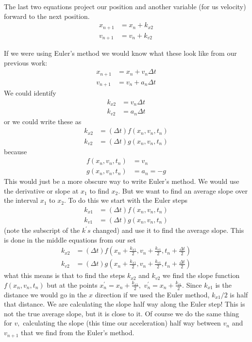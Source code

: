 \documentclass[twoside,11pt,ShortChapTitles]{BYUTextbook}
\begin{document}
The last two equations project our position and another variable (for us
velocity) forward to the next position. 
\begin{align*}
x_{n+1}  & =x_{n}+k_{x2}\\
v_{n+1}  & =v_{n}+k_{v2} \end{align*}


If we were using Euler's method we would know what these look like from our
previous work: 
\begin{align*}
x_{n+1}  & =x_{n}+v_{n}\Delta t\\
v_{n+1}  & =v_{n}+a_{n}\Delta t
\end{align*}
We could identify \begin{align*}
k_{x2}  & =v_{n}\Delta t\\
k_{v2}  & =a_{n}\Delta t
\end{align*}
or we could write these as
\begin{align*}
k_{x2}  & =(\Delta t)f(x_{n},v_{n},t_{n})\\
k_{v2}  & =(\Delta t)g(x_{n},v_{n},t_{n})
\end{align*}
because
\begin{align*}
f(x_{n},v_{n},t_{n})  & =v_{n}\\
g(x_{n},v_{n},t_{n})  & =a_{n}=-g
\end{align*}
This would just be a more obscure way to write Euler's method. We would use
the derivative or slope at $x_{1}$ to find $x_{2}.$ But we want to find an
average slope over the interval $x_{1}$ to $x_{2}.$ To do this we start with
the Euler steps
\begin{align*}
k_{x1}  & =(\Delta t)f(x_{n},v_{n},t_{n})\\
k_{v1}  & =(\Delta t)g(x_{n},v_{n},t_{n})
\end{align*}
(note the subscript of the $k^{\prime}s$ changed) and use it to find the
average slope. This is done in the middle equations from our set \begin{align*}
k_{x2}  & =(\Delta t)f\left(  x_{n}+\frac{k_{x1}}{2},v_{n}+\frac{k_{v1}} {2},t_{n}+\frac{\Delta t}{2}\right) \\
k_{v2}  & =(\Delta t)g\left(  x_{n}+\frac{k_{x1}}{2},v_{n}+\frac{k_{v1}} {2},t_{n}+\frac{\Delta t}{2}\right)
\end{align*}
what this means is that to find the steps $k_{x2}$ and $k_{v2}$ we find the
slope function $f(x_{n},v_{n},t_{n})$ but at the points $x_{n}^{\prime} =x_{n}+\frac{k_{x1}}{2},$ $v_{n}^{\prime}=x_{n}+\frac{k_{v1}}{2}.$ Since
$k_{x1}$ is the distance we would go in the $x$ direction if we used the Euler
method, $k_{x1}/2$ is half that distance. We are calculating the slope half
way along the Euler step! This is not the true average slope, but it is close
to it. Of course we do the same thing for $v,$ calculating the slope (this
time our acceleration) half way between $v_{n}$ and $v_{n+1}$ that we find
from the Euler's method.
\end{document}
